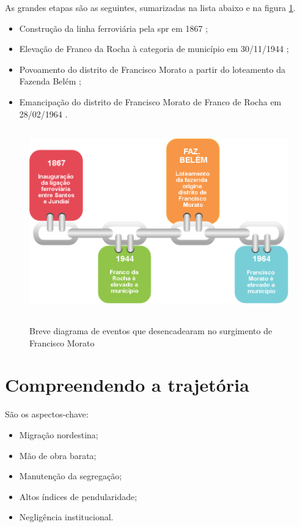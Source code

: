 	As grandes etapas são as seguintes, sumarizadas na lista abaixo e na figura \ref{fig:timeline}.
	
	\begin{itemize}
		\item Construção da linha ferroviária pela \gls{spr} em 1867 \cite[p.26]{ferreira2010a};
		\item Elevação de Franco da Rocha à categoria de município em 30/11/1944 \cite{ibge2018a};
		\item Povoamento do distrito de Francisco Morato a partir do loteamento da Fazenda Belém \cite[p.57]{cassiele2007a};
		\item Emancipação do distrito de Francisco Morato de Franco de Rocha em 28/02/1964 \cite[p.57]{cassiele2007a}.
	\end{itemize}
	
	\begin{figure}[H]
		\centering
		\caption[Diagrama do surgimento de Francisco Morato]{Breve diagrama de eventos que desencadearam no surgimento de Francisco Morato}
		\includegraphics[height=8cm]{img/linha_do_tempo}
		\label{fig:timeline}
	\end{figure}
	
	\section{Compreendendo a trajetória} \label{sec:balanco}
	
	São os aspectos-chave: 
	
	\begin{itemize}
		\item Migração nordestina;
		\item Mão de obra barata;
		\item Manutenção da segregação;
		\item Altos índices de pendularidade;
		\item Negligência institucional.
	\end{itemize}
	
